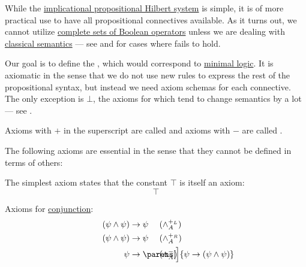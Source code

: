 \begin{definition}\label{def:minimal_propositional_hilbert_system}
  While the \hyperref[def:implicational_propositional_hilbert_system]{implicational propositional Hilbert system} is simple, it is of more practical use to have all propositional connectives available. As it turns out, we cannot utilize \hyperref[def:boolean_closure/complete]{complete sets of Boolean operators} unless we are dealing with \hyperref[def:propositional_semantics]{classical semantics} --- see  and  for cases where  fails to hold.

  Our goal is to define the , which would correspond to \hyperref[rem:minimal_logic]{minimal logic}. It is axiomatic in the sense that we do not use new rules to express the rest of the propositional syntax, but instead we need axiom schemas for each connective. The only exception is \hyperref[def:propositional_language/constants/verum]{\( \bot \)}, the axioms for which tend to change semantics by a lot --- see .

  Axioms with \( + \) in the superscript are called  and axioms with \( - \) are called .

  The following axioms are essential in the sense that they cannot be defined in terms of others:
  \begin{thmenum}[series=def:minimal_propositional_hilbert_system]
     The simplest axiom states that the constant \hyperref[def:propositional_language/constants/verum]{\( \top \)} is itself an axiom:
    \begin{equation}\label{eq:def:minimal_propositional_hilbert_system/top/intro}
      \top \tag{\( \top_A^+ \)}
    \end{equation}

     Axioms for \hyperref[def:propositional_language/connectives/conjunction]{conjunction}:
    \begin{align}
      \mathllap{ (\psi \wedge \psi) } &\rightarrow \mathrlap{ \psi } \tag{\( \wedge_A^{+_L} \)} \label{eq:def:minimal_propositional_hilbert_system/and/elim_left} \\
      \mathllap{ (\psi \wedge \psi) } &\rightarrow \mathrlap{ \psi } \tag{\( \wedge_A^{+_R} \)} \label{eq:def:minimal_propositional_hilbert_system/and/elim_right} \\
      \mathllap{ \psi }               &\rightarrow \mathrlap{ \parens[\Big]{ \psi \rightarrow (\psi \wedge \psi) } } \tag{\( \wedge_A^{-} \)} \label{eq:def:minimal_propositional_hilbert_system/and/intro}
    \end{align}


\end{thmenum}
\end{definition}
